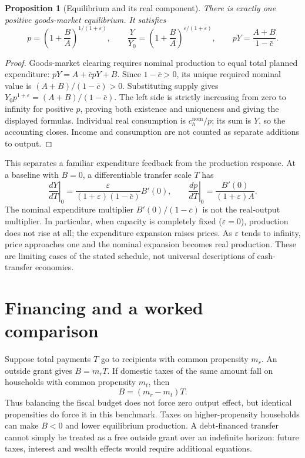 \documentclass[11pt]{article}
\newtheorem{proposition}{Proposition}
\begin{document}
\begin{proposition}[Equilibrium and its real component]
There is exactly one positive goods-market equilibrium. It satisfies
\[
 p=\left(1+\frac BA\right)^{1/(1+\varepsilon)},\qquad
 \frac{Y}{Y_0}=\left(1+\frac BA\right)^{\varepsilon/(1+\varepsilon)},
 \qquad pY=\frac{A+B}{1-\bar c}.
\]
\end{proposition}
\begin{proof}
Goods-market clearing requires nominal production to equal total planned expenditure:
$pY=A+\bar c pY+B$. Since $1-\bar c>0$, its unique required nominal value is $(A+B)/(1-\bar c)>0$. Substituting supply gives $Y_0p^{1+\varepsilon}=(A+B)/(1-\bar c)$. The left side is strictly increasing from zero to infinity for positive $p$, proving both existence and uniqueness and giving the displayed formulas. Individual real consumption is $c_h^{\mathrm{nom}}/p$; its sum is $Y$, so the accounting closes. Income and consumption are not counted as separate additions to output.
\end{proof}

This separates a familiar expenditure feedback from the production response. At a baseline with $B=0$, a differentiable transfer scale $T$ has
\[
 \left.\frac{dY}{dT}\right|_{0}
 =\frac{\varepsilon}{(1+\varepsilon)(1-\bar c)}B'(0),
 \qquad
 \left.\frac{dp}{dT}\right|_{0}
 =\frac{B'(0)}{(1+\varepsilon)A}.
\]
The nominal expenditure multiplier $B'(0)/(1-\bar c)$ is not the real-output multiplier. In particular, when capacity is completely fixed ($\varepsilon=0$), production does not rise at all; the expenditure expansion raises prices. As $\varepsilon$ tends to infinity, price approaches one and the nominal expansion becomes real production. These are limiting cases of the stated schedule, not universal descriptions of cash-transfer economies.

\section*{Financing and a worked comparison}
Suppose total payments $T$ go to recipients with common propensity $m_r$. An outside grant gives $B=m_rT$. If domestic taxes of the same amount fall on households with common propensity $m_t$, then
\[
 B=(m_r-m_t)T.
\]
Thus balancing the fiscal budget does not force zero output effect, but identical propensities do force it in this benchmark. Taxes on higher-propensity households can make $B<0$ and lower equilibrium production. A debt-financed transfer cannot simply be treated as a free outside grant over an indefinite horizon: future taxes, interest and wealth effects would require additional equations.
\end{document}
